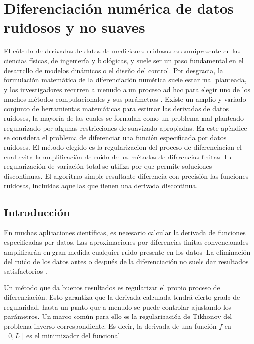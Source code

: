 \chapter{Diferenciación numérica de datos ruidosos y no suaves}\label{C:ap1}
\graphicspath{{figs/apendice_derivada_ruidosa}}




El cálculo de derivadas de datos de mediciones ruidosas es omnipresente en las ciencias físicas, de ingeniería y biológicas, y suele ser un paso fundamental en el desarrollo de modelos dinámicos o el diseño del control. Por desgracia, la formulación matemática de la diferenciación numérica suele estar mal planteada, y los investigadores recurren a menudo a un proceso ad hoc para elegir uno de los muchos métodos computacionales y sus parámetros \cite{9241009}. Existe un amplio y variado conjunto de herramientas matemáticas para estimar las derivadas de datos ruidosos, la mayoría de las cuales se formulan como un problema mal planteado regularizado por algunas restricciones de suavizado apropiadas.  En este apéndice se considera el problema de diferenciar una función especificada por datos ruidosos. El método  elegido es la \gls{regularizacion} del proceso de diferenciación el cual evita la amplificación de ruido de los métodos de diferencias finitas.  La regularización de variación total se utiliza por que permite soluciones discontinuas. El algoritmo simple resultante diferencia con precisión las funciones ruidosas, incluidas aquellas que tienen una derivada discontinua.

\section{Introducción}

En muchas aplicaciones científicas, es necesario calcular la derivada de funciones especificadas por datos. Las aproximaciones por diferencias finitas convencionales amplificarán en gran medida cualquier ruido presente en los datos. La eliminación del ruido de los datos antes o después de la diferenciación no suele dar resultados satisfactorios \cite{chartrand_numerical_2011}.  

Un método que da buenos resultados es regularizar el propio proceso de diferenciación. Esto garantiza que la derivada calculada tendrá cierto grado de regularidad, hasta un punto que a menudo se puede controlar ajustando los parámetros. Un marco común para ello es la regularización de Tikhonov \cite{1570291226450870144} del problema inverso correspondiente. Es decir, la derivada de una función  $f$ en  $[0,L]$ es el minimizador del funcional

